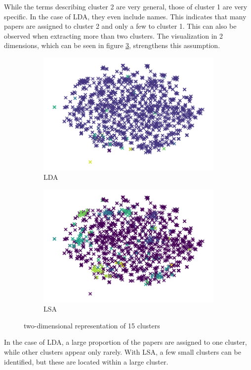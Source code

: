 While the terms describing cluster 2 are very general, those of cluster 1 are very specific.
In the case of LDA, they even include names.
This indicates that many papers are assigned to cluster 2 and only a few to cluster 1.
This can also be observed when extracting more than two clusters.
The visualization in 2 dimensions, which can be seen in figure \ref{fig:lda_lsa}, strengthens this assumption.
\begin{figure}
\centering
\begin{subfigure}{.4\textwidth}
  \centering
  \includegraphics[width=\linewidth]{imgs/lda.png}
  \caption{LDA}
  \label{fig:lda}
\end{subfigure}%
\begin{subfigure}{.4\textwidth}
  \centering
  \includegraphics[width=\linewidth]{imgs/lsa.png}
  \caption{LSA}
  \label{fig:lsa}
\end{subfigure}
\caption{two-dimensional representation of 15 clusters}
\label{fig:lda_lsa}
\end{figure}
In the case of LDA, a large proportion of the papers are assigned to one cluster, while other clusters appear only rarely.
With LSA, a few small clusters can be identified, but these are located within a large cluster.

